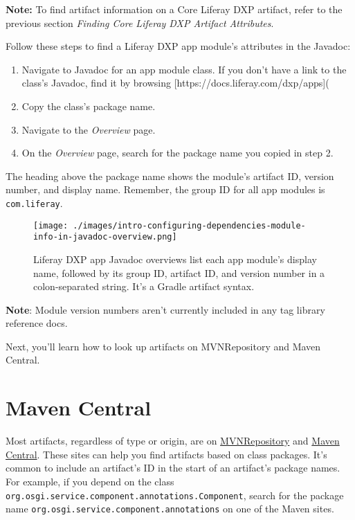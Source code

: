\noindent\hrulefill

\textbf{Note:} To find artifact information on a Core Liferay DXP
artifact, refer to the previous section \emph{Finding Core Liferay DXP
Artifact Attributes}.

\noindent\hrulefill

Follow these steps to find a Liferay DXP app module's attributes in the
Javadoc:

\begin{enumerate}
\def\labelenumi{\arabic{enumi}.}
\item
  Navigate to Javadoc for an app module class. If you don't have a link
  to the class's Javadoc, find it by browsing
  {[}https://docs.liferay.com/dxp/apps{]}(
\item
  Copy the class's package name.
\item
  Navigate to the \emph{Overview} page.
\item
  On the \emph{Overview} page, search for the package name you copied in
  step 2.
\end{enumerate}

The heading above the package name shows the module's artifact ID,
version number, and display name. Remember, the group ID for all app
modules is \texttt{com.liferay}.

\begin{figure}
\centering
\texttt{[image: ./images/intro-configuring-dependencies-module-info-in-javadoc-overview.png]}
\caption{Liferay DXP app Javadoc overviews list each app module's
display name, followed by its group ID, artifact ID, and version number
in a colon-separated string. It's a Gradle artifact syntax.}
\end{figure}

\noindent\hrulefill

\textbf{Note}: Module version numbers aren't currently included in any
tag library reference docs.

\noindent\hrulefill

Next, you'll learn how to look up artifacts on MVNRepository and Maven
Central.

\section{Maven Central}\label{maven-central}

Most artifacts, regardless of type or origin, are on
\href{https://mvnrepository.com/}{MVNRepository} and
\href{https://search.maven.org/}{Maven Central}. These sites can help
you find artifacts based on class packages. It's common to include an
artifact's ID in the start of an artifact's package names. For example,
if you depend on the class
\texttt{org.osgi.service.component.annotations.Component}, search for
the package name \texttt{org.osgi.service.component.annotations} on one
of the Maven sites.

